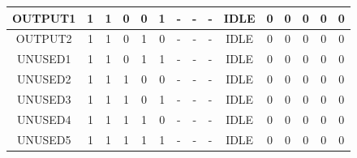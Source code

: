\begin{table}[H]
{\begin{tabular}{|cccccc|ccc|cccccc|}
\multicolumn{1}{|c|}{OUTPUT1} & \multicolumn{1}{c|}{1}  & \multicolumn{1}{c|}{1}  & \multicolumn{1}{c|}{0}  & \multicolumn{1}{c|}{0}  & 1  & \multicolumn{1}{c|}{-}    & \multicolumn{1}{c|}{-}        & -    & \multicolumn{1}{c|}{IDLE}    & \multicolumn{1}{c|}{0}  & \multicolumn{1}{c|}{0}  & \multicolumn{1}{c|}{0}  & \multicolumn{1}{c|}{0}  & 0  \\ \hline
\multicolumn{1}{|c|}{OUTPUT2} & \multicolumn{1}{c|}{1}  & \multicolumn{1}{c|}{1}  & \multicolumn{1}{c|}{0}  & \multicolumn{1}{c|}{1}  & 0  & \multicolumn{1}{c|}{-}    & \multicolumn{1}{c|}{-}        & -    & \multicolumn{1}{c|}{IDLE}    & \multicolumn{1}{c|}{0}  & \multicolumn{1}{c|}{0}  & \multicolumn{1}{c|}{0}  & \multicolumn{1}{c|}{0}  & 0  \\ \hline
\multicolumn{1}{|c|}{UNUSED1} & \multicolumn{1}{c|}{1}  & \multicolumn{1}{c|}{1}  & \multicolumn{1}{c|}{0}  & \multicolumn{1}{c|}{1}  & 1  & \multicolumn{1}{c|}{-}    & \multicolumn{1}{c|}{-}        & -    & \multicolumn{1}{c|}{IDLE}    & \multicolumn{1}{c|}{0}  & \multicolumn{1}{c|}{0}  & \multicolumn{1}{c|}{0}  & \multicolumn{1}{c|}{0}  & 0  \\ \hline
\multicolumn{1}{|c|}{UNUSED2} & \multicolumn{1}{c|}{1}  & \multicolumn{1}{c|}{1}  & \multicolumn{1}{c|}{1}  & \multicolumn{1}{c|}{0}  & 0  & \multicolumn{1}{c|}{-}    & \multicolumn{1}{c|}{-}        & -    & \multicolumn{1}{c|}{IDLE}    & \multicolumn{1}{c|}{0}  & \multicolumn{1}{c|}{0}  & \multicolumn{1}{c|}{0}  & \multicolumn{1}{c|}{0}  & 0  \\ \hline
\multicolumn{1}{|c|}{UNUSED3} & \multicolumn{1}{c|}{1}  & \multicolumn{1}{c|}{1}  & \multicolumn{1}{c|}{1}  & \multicolumn{1}{c|}{0}  & 1  & \multicolumn{1}{c|}{-}    & \multicolumn{1}{c|}{-}        & -    & \multicolumn{1}{c|}{IDLE}    & \multicolumn{1}{c|}{0}  & \multicolumn{1}{c|}{0}  & \multicolumn{1}{c|}{0}  & \multicolumn{1}{c|}{0}  & 0  \\ \hline
\multicolumn{1}{|c|}{UNUSED4} & \multicolumn{1}{c|}{1}  & \multicolumn{1}{c|}{1}  & \multicolumn{1}{c|}{1}  & \multicolumn{1}{c|}{1}  & 0  & \multicolumn{1}{c|}{-}    & \multicolumn{1}{c|}{-}        & -    & \multicolumn{1}{c|}{IDLE}    & \multicolumn{1}{c|}{0}  & \multicolumn{1}{c|}{0}  & \multicolumn{1}{c|}{0}  & \multicolumn{1}{c|}{0}  & 0  \\ \hline
\multicolumn{1}{|c|}{UNUSED5} & \multicolumn{1}{c|}{1}  & \multicolumn{1}{c|}{1}  & \multicolumn{1}{c|}{1}  & \multicolumn{1}{c|}{1}  & 1  & \multicolumn{1}{c|}{-}    & \multicolumn{1}{c|}{-}        & -    & \multicolumn{1}{c|}{IDLE}    & \multicolumn{1}{c|}{0}  & \multicolumn{1}{c|}{0}  & \multicolumn{1}{c|}{0}  & \multicolumn{1}{c|}{0}  & 0  \\ \hline
\end{tabular}}
\end{table}


